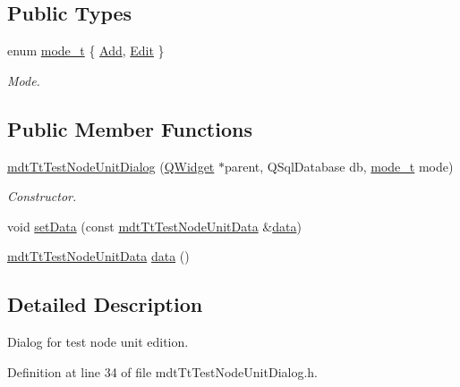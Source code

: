 \subsection*{Public Types}
\begin{DoxyCompactItemize}
\item 
enum \hyperlink{classmdt_tt_test_node_unit_dialog_a27aec8b26b20230fcf0054e2f2f5c18e}{mode\-\_\-t} \{ \hyperlink{classmdt_tt_test_node_unit_dialog_a27aec8b26b20230fcf0054e2f2f5c18ea2cbe738c7f02392a4958df04614f09bf}{Add}, 
\hyperlink{classmdt_tt_test_node_unit_dialog_a27aec8b26b20230fcf0054e2f2f5c18ea24f18a30dc0ef344be1955ba4438d525}{Edit}
 \}
\begin{DoxyCompactList}\small\item\em Mode. \end{DoxyCompactList}\end{DoxyCompactItemize}
\subsection*{Public Member Functions}
\begin{DoxyCompactItemize}
\item 
\hyperlink{classmdt_tt_test_node_unit_dialog_adfa9847e393a29d13d00a36c48923f47}{mdt\-Tt\-Test\-Node\-Unit\-Dialog} (\hyperlink{class_q_widget}{Q\-Widget} $\ast$parent, Q\-Sql\-Database db, \hyperlink{classmdt_tt_test_node_unit_dialog_a27aec8b26b20230fcf0054e2f2f5c18e}{mode\-\_\-t} mode)
\begin{DoxyCompactList}\small\item\em Constructor. \end{DoxyCompactList}\item 
void \hyperlink{classmdt_tt_test_node_unit_dialog_a1fe2ce1e5827220dda22cca8186c3fc4}{set\-Data} (const \hyperlink{classmdt_tt_test_node_unit_data}{mdt\-Tt\-Test\-Node\-Unit\-Data} \&\hyperlink{classmdt_tt_test_node_unit_dialog_a16b2edaaa868880357013c9875903662}{data})
\item 
\hyperlink{classmdt_tt_test_node_unit_data}{mdt\-Tt\-Test\-Node\-Unit\-Data} \hyperlink{classmdt_tt_test_node_unit_dialog_a16b2edaaa868880357013c9875903662}{data} ()
\end{DoxyCompactItemize}


\subsection{Detailed Description}
Dialog for test node unit edition. 

Definition at line 34 of file mdt\-Tt\-Test\-Node\-Unit\-Dialog.\-h.




